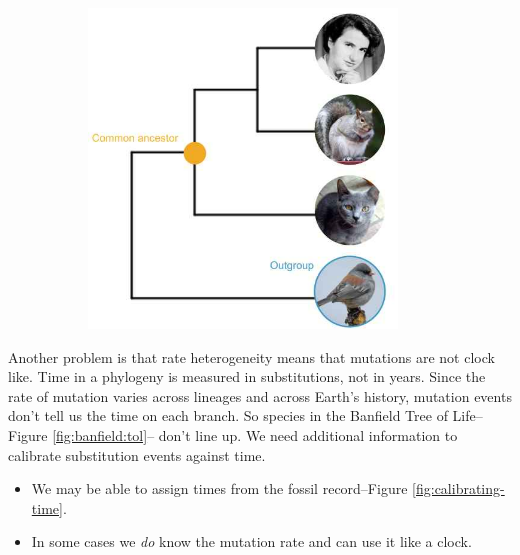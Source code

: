 \documentclass[]{article}
\begin{document}
\begin{figure}[H]
\begin{subfigure}[t]{0.3\textwidth}
		\includegraphics[width=0.9\textwidth]{bird-mammals}
	\end{subfigure}
\end{figure}

Another problem is that rate heterogeneity means that mutations are not clock like\cite{sanderson2003r8s,smit2007evolutionary}. Time in a phylogeny is measured in substitutions, not in years. Since the rate of mutation varies across lineages and across Earth's history, mutation events don't tell us the time on each branch. So species in the Banfield Tree of Life--Figure \ref{fig:banfield:tol}-- don't line up. We need additional information to calibrate substitution events against time.
\begin{itemize}
	\item We may be able to assign times from the fossil record--Figure \ref{fig:calibrating-time}.
	\item In some cases we \textit{do} know the mutation rate and can use it like a clock.
\end{itemize}
\end{document}
